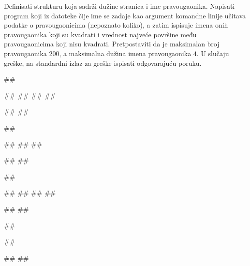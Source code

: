 \begin{Exercise}[label=p3_x1]         
Definisati strukturu  koja sadrži dužine stranica i ime pravougaonika.
Napisati program koji iz datoteke čije ime se zadaje kao argument komandne linije 
učitava podatke o pravougaonicima (nepoznato koliko), 
a zatim ispisuje imena onih pravougaonika koji su kvadrati i vrednost 
najveće površine među pravougaonicima koji nisu kvadrati.
Pretpostaviti da je maksimalan broj pravougaonika $200$, a maksimalna dužina imena pravougaonika $4$.
U slučaju greške, na standardni izlaz za greške ispisati odgovarajuću poruku.

\begin{miditest}
\begin{upotreba}{1}
##

##
##
##
##

#\naslovIzlaz#
##
\end{upotreba}
\end{miditest}
\begin{miditest}
\begin{upotreba}{2}
##

##
##
##

#\naslovIzlaz#
##
\end{upotreba}
\end{miditest}

\begin{miditest}
\begin{upotreba}{3}
##

##
##
##
##

#\naslovIzlaz#
##
\end{upotreba}
\end{miditest}
\begin{miditest}
\begin{upotreba}{4}
##

##

#\naslovIzlaz#
#\izlaz{}#
\end{upotreba}
\end{miditest}
\end{Exercise}
\begin{Answer}[ref=p3_x1]
\end{Answer}


